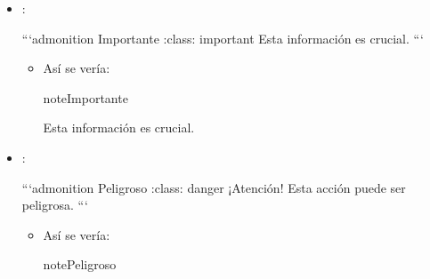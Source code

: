 \documentclass[a4paper,10pt,spanish]{sphinxmanual}
\begin{document}
\begin{itemize}
\begin{sphinxVerbatim}[commandchars=\\\{\}]
  ```\PYGZob{}admonition\PYGZcb{} Consejo :class: tip Aquí tienes un consejo útil. ```
\end{sphinxVerbatim}
\begin{itemize}
\item {} 
\sphinxAtStartPar
Así se vería:

\begin{sphinxadmonition}{note}{Consejo}

\sphinxAtStartPar
Aquí tienes un consejo útil.
\end{sphinxadmonition}

\end{itemize}

\item {} 
\sphinxAtStartPar
{}:

\begin{sphinxVerbatim}[commandchars=\\\{\}]
  ```\PYGZob{}admonition\PYGZcb{} Importante :class: important Esta información es crucial. ```
\end{sphinxVerbatim}
\begin{itemize}
\item {} 
\sphinxAtStartPar
Así se vería:

\begin{sphinxadmonition}{note}{Importante}

\sphinxAtStartPar
Esta información es crucial.
\end{sphinxadmonition}

\end{itemize}

\item {} 
\sphinxAtStartPar
{}:

\begin{sphinxVerbatim}[commandchars=\\\{\}]
  ```\PYGZob{}admonition\PYGZcb{} Peligroso :class: danger ¡Atención! Esta acción puede ser peligrosa. ```
\end{sphinxVerbatim}
\begin{itemize}
\item {} 
\sphinxAtStartPar
Así se vería:

\begin{sphinxadmonition}{note}{Peligroso}


\end{sphinxadmonition}
\end{itemize}
\end{itemize}
\end{document}
